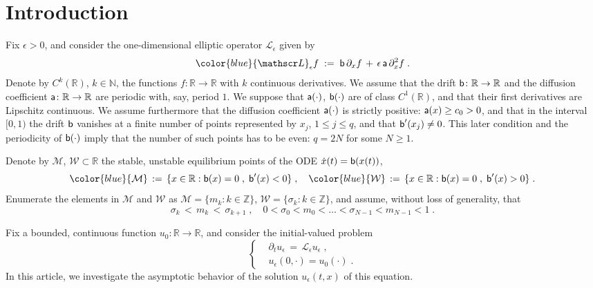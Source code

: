 \documentclass[reqno]{amsart}
\theoremstyle{plain}
\theoremstyle{definition}
\newcommand{\mc}[1]{{\mathcal #1}}
\newcommand{\bb}[1]{{\mathbb #1}}
\newcommand{\ms}[1]{{\mathscr #1}}
\newcommand{\mss}[1]{{\textsf #1}}
\newcounter{as}[section]
\newcommand{\<}{\langle}
\renewcommand{\>}{\rangle}
\begin{document}
\section{Introduction}
\label{sec0}

Fix $\epsilon>0$, and consider the one-dimensional elliptic operator
$\ms L_\epsilon$ given by
\begin{equation*}
{\color{blue}\ms L_\epsilon f } \;:=\;
\mss b \, \partial_x  f  \,+\,
\epsilon\, \mss a\, \partial^2_x f \;.
\end{equation*}
Denote by $C^k(\bb R)$, $k\in\bb N$, the functions
$f\colon \bb R \to\bb R$ with $k$ continuous derivatives.  We assume
that the drift $\mss b\colon \bb R \to \bb R$ and the diffusion
coefficient $\mss a\colon \bb R \to \bb R$ are periodic with, say,
period $1$. We suppose that $\mss a(\cdot)$, $\mss b(\cdot)$ are of
class $C^1(\bb R)$, and that their first derivatives are Lipschitz
continuous. We assume furthermore that the diffusion coefficient
$\mss a(\cdot)$ is strictly positive: $\mss a(x) \ge c_0 >0$, and that
in the interval $[0,1)$ the drift $\mss b$ vanishes at a finite number
of points represented by $x_j$, $1\le j\le q$, and that
$\mss b'(x_j) \neq 0$. This later condition and the periodicity of
$\mss b(\cdot)$ imply that the number of such points has to be even:
$q=2N$ for some $N\ge 1$.

Denote by $\mc M$, $\mc W \subset \bb R$ the stable, unstable
equilibrium points of the ODE $\dot x(t) = \mss b(x(t))$,
\begin{equation}
\label{76}
{\color{blue} \mc M} \,:=\,  \{ x \in \bb R:
\mss b(x ) = 0 \;,\; \mss b'(x) < 0\}
\;, \quad
{\color{blue} \mc W} \,:=\,  \{ x \in \bb R:
\mss b(x ) = 0 \;,\;  \mss b'(x ) > 0\} \;.
\end{equation}
Enumerate the elements in $\mc M$ and $\mc W$ as
$\mc M = \{m_k : k\in \bb Z \}$, $\mc W = \{\sigma_k : k\in \bb Z \}$,
and assume, without loss of generality, that
\begin{equation}
\label{68}
\sigma_k \,<\,  m_k \,<\, \sigma_{k+1}\;, \quad 
0 < \sigma_0 < m_0 < \dots < \sigma_{N-1} < m_{N-1} < 1\;.
\end{equation}

Fix a bounded, continuous function $u_0 : \bb R \to \bb R$, and
consider the initial-valued problem
\begin{equation}
\label{51}
\left\{
\begin{aligned}
& \partial_ t u_\epsilon\,=\, \ms L_\epsilon u_\epsilon\;, \\
& u_\epsilon (0, \cdot) = u_0(\cdot) \;.
\end{aligned}
\right.
\end{equation}
In this article, we investigate the asymptotic behavior of the
solution $u_\epsilon(t,x)$ of this equation.
\end{document}
